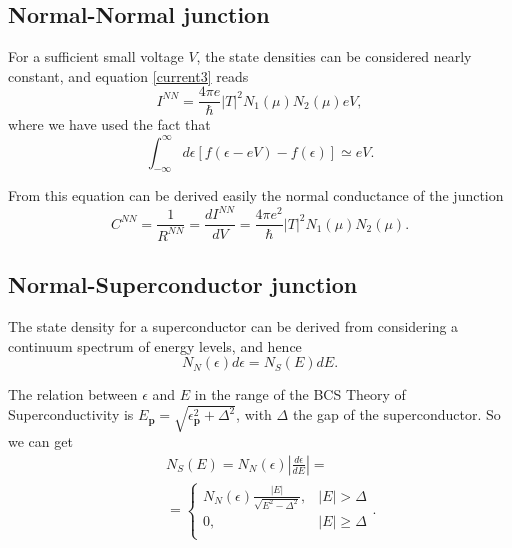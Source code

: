 \documentclass[twocolumn, twoside,a4paper,10pt]{article}
\begin{document}
\subsection{Normal-Normal junction}
For a sufficient small voltage $V$, the state densities can be considered nearly constant, and equation \eqref{current3} reads
\begin{equation}\label{inn}
I^{NN} = \frac{4\pi e}{\hbar} |T|^2 N_1(\mu)N_2(\mu) eV,
\end{equation}
where we have used the fact that $$ \int_{-\infty}^{\infty}d\epsilon [f(\epsilon-eV)-f(\epsilon)] \simeq eV. $$

From this equation can be derived easily the normal conductance of the junction
\begin{equation}\label{cnn}
C^{NN} = \frac{1}{R^{NN}} = \frac{dI^{NN}}{dV} = \frac{4\pi e^2}{\hbar} |T|^2 N_1(\mu)N_2(\mu).
\end{equation}


\subsection{Normal-Superconductor junction} 
The state density for a superconductor can be derived from considering a continuum spectrum of energy levels, and hence
\begin{equation}
N_N(\epsilon) d\epsilon = N_S(E)dE.
\end{equation}

The relation between $\epsilon$ and $E$ in the range of the BCS Theory of Superconductivity is $E_{\mathbf{p}} = \sqrt{\epsilon_{\mathbf{p}}^2 + \Delta^2}$, with $\Delta$ the gap of the superconductor. So we can get
\begin{eqnarray}\label{ns}
&&N_S(E) = N_N(\epsilon) \left | \frac{d\epsilon}{dE} \right | = 
	\nonumber \\
&& = \left\{ 
\begin{array}{ll} 
N_N(\epsilon)\frac{|E|}{\sqrt{E^2-\Delta^2}},	&	|E| > \Delta 	\\ 
0,								& 	|E| \geq \Delta	\\
\end{array}
\right..
	\nonumber \\
\end{eqnarray}
\end{document}
